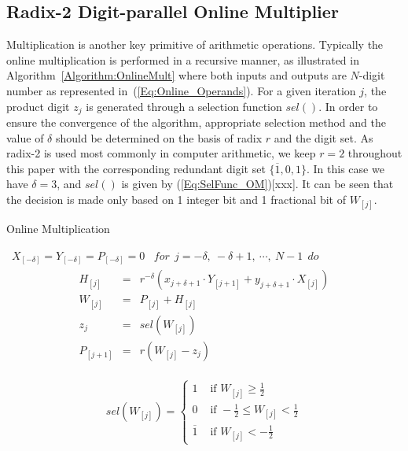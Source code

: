 \documentclass{acm_proc_article-sp}
\begin{document}
\subsection{Radix-2 Digit-parallel Online Multiplier}
Multiplication is another key primitive of arithmetic operations. Typically the online multiplication is performed in a recursive manner, as illustrated in Algorithm~\ref{Algorithm:OnlineMult} where both inputs and outputs are $N$-digit number as represented in~(\ref{Eq:Online_Operands}). For a given iteration $j$, the product digit $z_j$ is generated through a selection function $sel()$. In order to ensure the convergence of the algorithm, appropriate selection method and the value of $\delta$ should be determined on the basis of radix $r$ and the digit set. As radix-2 is used most commonly in computer arithmetic, we keep $r=2$ throughout this paper with the corresponding redundant digit set $\{\overline{1},0,1\}$. In this case we have $\delta=3$, and $sel()$ is given by (\ref{Eq:SelFunc_OM})[xxx]. It can be seen that the decision is made only based on 1 integer bit and 1 fractional bit of $W_{[j]}$.
%
\begin{algorithm}[tbp]
  \caption{Online Multiplication}
  \begin{algorithmic}[1]
    \REQUIRE~$X_{[-\delta]}=Y_{[-\delta]}=P_{[-\delta]}=0$
    \ENSURE~$for~~ j=-\delta,~-\delta+1,~\cdots,~N-1 ~~do$
      \begin{eqnarray}\label{Eq:OnlineMult_General}
        \begin{matrix}
          H_{[j]}   & = & r^{-\delta}\left(x_{j+\delta+1}\cdot Y_{[j+1]}+y_{j+\delta+1}\cdot X_{[j]}\right)\\
          W_{[j]}   & = & P_{[j]} + H_{[j]}\\
          z_j       & = & sel(W_{[j]})\\
          P_{[j+1]} & = & r\left(W_{[j]}-z_j\right)
        \end{matrix}
      \end{eqnarray}
  \label{Algorithm:OnlineMult}
  \end{algorithmic}
\end{algorithm}
%
\begin{eqnarray}\label{Eq:SelFunc_OM}
  sel(W_{[j]})=\begin{cases}
    1 & \text{ if } W_{[j]} \geqslant \frac{1}{2} \\
    0 & \text{ if } -\frac{1}{2}\leqslant W_{[j]}<\frac{1}{2} \\
    \overline{1} & \text{ if } W_{[j]}<-\frac{1}{2}
  \end{cases}
\end{eqnarray}
\end{document}

